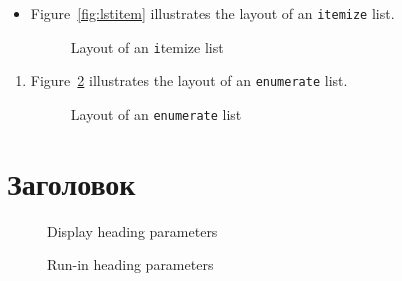 \documentclass[a4paper,hidelinks,14pt]{extarticle}
\begin{document}
\begin{itemize}
\item Figure~\ref{fig:lstitem} illustrates the layout of an
\texttt{itemize} list.
\currentlist
\begin{figure}
\drawparametersfalse
\drawlist
\caption{Layout of an \texttt itemize list} \label{fig:lstenum}
\end{figure}
\end{itemize}


\begin{enumerate}
\item Figure~\ref{fig:lstenum} illustrates the layout of an
\texttt{enumerate} list.
\currentlist
\begin{figure}
\drawparametersfalse
\drawlist
\caption{Layout of an \texttt{enumerate} list} \label{fig:lstenum}
\end{figure}
\end{enumerate}

\section{Заголовок}

\begin{figure}
\drawheading{ }
\caption{Display heading parameters}\label{fig:hdp}
\end{figure}

\begin{figure}
\runinheadtrue
\drawheading{ }
\caption{Run-in heading parameters}\label{fig:hrp}
\end{figure}
\end{document}
